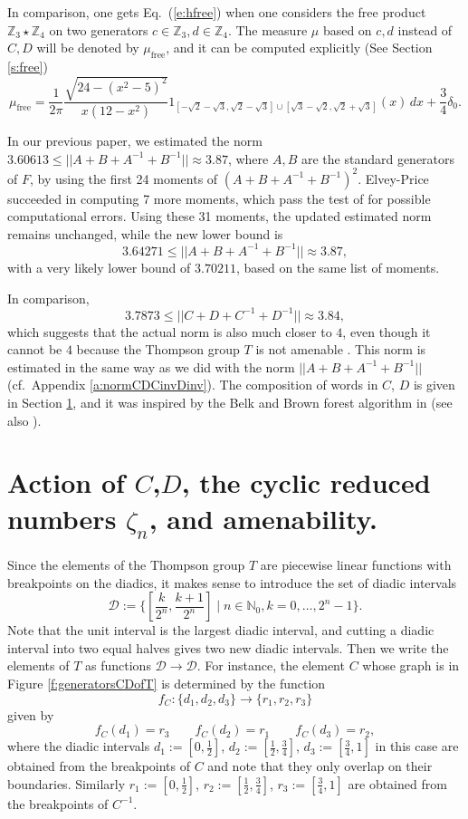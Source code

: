 \documentclass{amsart}
\newcommand{\N}{\mathbb N}
\newcommand{\Z}{\mathbb Z}
\newcommand{\fD}{\mathcal D}
\theoremstyle{definition}
\begin{document}
 In comparison, one gets  Eq.~(\ref{e:hfree}) when one considers the free product $\Z_3\star \Z_4$ on two generators $c\in\Z_3,d\in\Z_4$.
The measure $\mu$ based on $c,d$ instead of $C,D$ will be denoted by $\mu_{\mathrm{free}}$, and it can be computed explicitly (See Section \ref{s:free})
\begin{equation}\label{e:mufree}
\mu_{\mathrm{free}}=\frac{1}{2\pi}\frac{\sqrt{24-(x^2-5)^2}}{x(12-x^2)}1_{[-\sqrt2-\sqrt3,\sqrt2-\sqrt3]\cup[\sqrt3-\sqrt2,\sqrt2+\sqrt3]}(x)\,dx+\frac34\delta_0.
\end{equation}

In our previous paper, we estimated the norm $3.60613\le||A+B+A^{-1}+B^{-1}||\approx 3.87$, where $A,B$ are the standard generators of $F$, by using the first 24 moments of $(A+B+A^{-1}+B^{-1})^2$. Elvey-Price \cite{EP} succeeded in computing 7 more moments, which pass the test of \cite[Theorem B.1]{HaagerupRamirezSolano} for possible computational errors.
 Using these 31 moments, the updated estimated norm remains unchanged, while the new lower bound is
$$3.64271\le||A+B+A^{-1}+B^{-1}||\approx 3.87,$$
with a very likely lower bound of $3.70211$, based on the same list of moments.

In comparison, 
$$3.7873\le||C+D+C^{-1}+D^{-1}||\approx 3.84,$$
which suggests that the actual norm is also much closer to $4$, even though it cannot be $4$ because the Thompson group $T$ is not amenable \cite{BrinS}. This norm is estimated in the same way as we did with the norm $||A+B+A^{-1}+B^{-1}||$ (cf.~Appendix \ref{a:normCDCinvDinv}). The composition of words in $C$, $D$ is given in Section \ref{s:amenability}, and it was inspired by the Belk and Brown forest algorithm in \cite{BelkBrownForestDiagrams} (see also \cite{Burillo}).
 


\section{\textbf{Action of $C$,$D$, the cyclic reduced numbers $\zeta_n$, and amenability.}}\label{s:amenability}
Since the elements of the Thompson group $T$ are piecewise linear functions with breakpoints on the diadics, it makes sense to introduce the set of diadic intervals
$$\fD:=\{[\frac{k}{2^n} , \frac{k + 1}{2^n} ] \mid n \in \N_0 , k = 0,\ldots , 2^n-1\}.$$
Note that the unit interval is the largest diadic interval, and cutting a diadic interval into two equal halves gives two new diadic intervals. Then we write the elements of $T$ as functions $\fD\to\fD$.
For instance, the element $C$ whose graph is in Figure \ref{f:generatorsCDofT} is determined by the function 
$$f_{C}:\{d_1, d_2, d_3\}\to \{r_1,r_2,r_3\}$$
given by
$$f_C(d_1)=r_3\qquad f_C(d_2)=r_1\qquad f_C(d_3)=r_2,$$
where the diadic intervals
$d_1:=[0,\frac12]$, $d_2:=[\frac12,\frac34]$, $d_3:=[\frac34,1]$ in this case are obtained from the breakpoints of $C$ and note that they only overlap on their boundaries. Similarly $r_1:=[0,\frac12]$, $r_2:=[\frac12,\frac34]$, $r_3:=[\frac34,1]$ are obtained from the breakpoints of $C^{-1}$.
 
\end{document}
